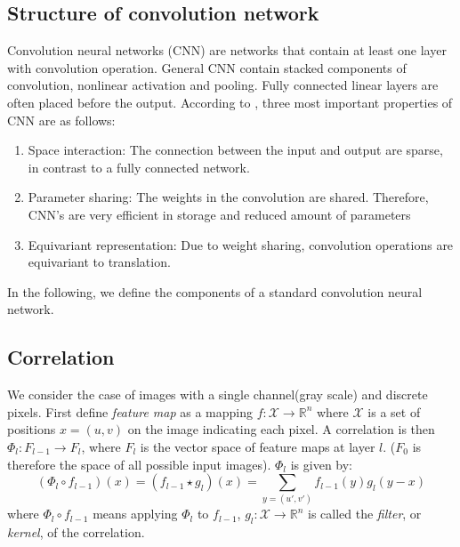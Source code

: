 \documentclass{article}
\begin{document}
\subsection*{Structure of convolution network}
Convolution neural networks (CNN) are networks that contain at least one layer with convolution operation. 
General CNN contain stacked components of convolution, nonlinear activation and pooling. 
Fully connected linear layers are often placed before the output.
According to \cite{goodfellow_deep_2016}, 
three most important properties of CNN are as follows:
\begin{enumerate}
    \item Space interaction: The connection between the input and output are sparse, in contrast to a fully connected network.
    \item Parameter sharing: The weights in the convolution are shared. Therefore, CNN's are very efficient in storage and reduced amount of parameters 
    \item Equivariant representation: Due to weight sharing, convolution operations are equivariant to translation.
\end{enumerate}
In the following, we define the components of a standard convolution neural network.

\subsection*{Correlation}
We consider the case of images with a single channel(gray scale) and discrete pixels. 
First define \emph{feature map} as a mapping $f\colon \mathcal{X}\to \mathbb{R}^n$ where $\mathcal{X}$ is a 
set of positions $x = (u,v)$ on the image indicating each pixel.
A correlation is then $\Phi_l\colon F_{l-1} \to F_{l}$, where $F_l$ is the vector space of feature maps at layer $l$. 
($F_0$ is therefore the space of all possible input images).
$\Phi_l$ is given by:
\begin{equation}
    \label{E:convolution}
    (\Phi_l \circ f_{l-1})(x) = (f_{l-1} \star g_l)(x) = \sum_{y = (u',v')} f_{l-1}(y) g_l(y-x)
\end{equation}
where $\Phi_l \circ f_{l-1}$ means applying $\Phi_l$ to $f_{l-1}$, 
$g_l\colon \mathcal{X}\to \mathbb{R}^n$ is called the \emph{filter}, or \emph{kernel}, of the correlation. 

\end{document}
